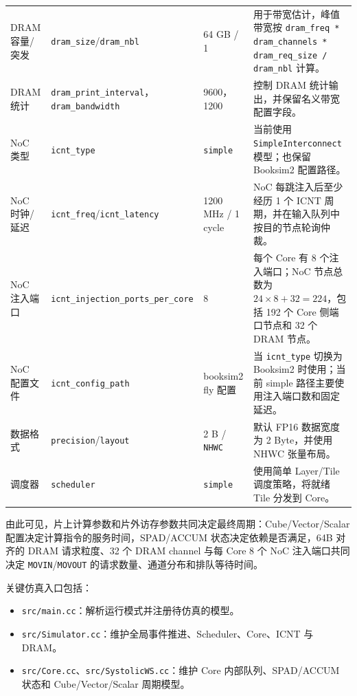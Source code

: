 \documentclass{CjC}
\begin{document}
\begin{table}[H]
\begin{tabular}{p{2.4cm} p{3.2cm} p{2.3cm} p{5.4cm}}
            DRAM 容量/突发 & \texttt{dram\_size}/\texttt{dram\_nbl} & 64 GB / 1 &
            用于带宽估计，峰值带宽按 \texttt{dram\_freq * dram\_channels * dram\_req\_size / dram\_nbl} 计算。 \\

            DRAM 统计 & \texttt{dram\_print\_interval}，\texttt{dram\_bandwidth} & 9600，1200 &
            控制 DRAM 统计输出，并保留名义带宽配置字段。 \\

            NoC 类型 & \texttt{icnt\_type} & \texttt{simple} &
            当前使用 \texttt{SimpleInterconnect} 模型；也保留 Booksim2 配置路径。 \\

            NoC 时钟/延迟 & \texttt{icnt\_freq}/\texttt{icnt\_latency} & 1200 MHz / 1 cycle &
            NoC 每跳注入后至少经历 1 个 ICNT 周期，并在输入队列中按目的节点轮询仲裁。 \\

            NoC 注入端口 & \texttt{icnt\_injection\_ports\_per\_core} & 8 &
            每个 Core 有 8 个注入端口；NoC 节点总数为 $24\times8+32=224$，包括 192 个 Core 侧端口节点和 32 个 DRAM 节点。 \\

            NoC 配置文件 & \texttt{icnt\_config\_path} & booksim2 fly 配置 &
            当 \texttt{icnt\_type} 切换为 Booksim2 时使用；当前 simple 路径主要使用注入端口数和固定延迟。 \\

            数据格式 & \texttt{precision}/\texttt{layout} & 2 B / \texttt{NHWC} &
            默认 FP16 数据宽度为 2 Byte，并使用 NHWC 张量布局。 \\

            调度器 & \texttt{scheduler} & \texttt{simple} &
            使用简单 Layer/Tile 调度策略，将就绪 Tile 分发到 Core。 \\
            \bottomrule
        \end{tabular}
    \end{table}

    由此可见，片上计算参数和片外访存参数共同决定最终周期：Cube/Vector/Scalar
    配置决定计算指令的服务时间，SPAD/ACCUM 状态决定依赖是否满足，64B 对齐的 DRAM 请求粒度、32 个 DRAM channel
    与每 Core 8 个 NoC 注入端口共同决定 \texttt{MOVIN}/\texttt{MOVOUT} 的请求数量、通道分布和排队等待时间。

    关键仿真入口包括：
    \begin{itemize}
        \item \texttt{src/main.cc}：解析运行模式并注册待仿真的模型。

        \item \texttt{src/Simulator.cc}：维护全局事件推进、Scheduler、Core、ICNT 与 DRAM。

        \item \texttt{src/Core.cc}、\texttt{src/SystolicWS.cc}：维护 Core 内部队列、SPAD/ACCUM 状态和 Cube/Vector/Scalar 周期模型。
    \end{itemize}
\end{document}
